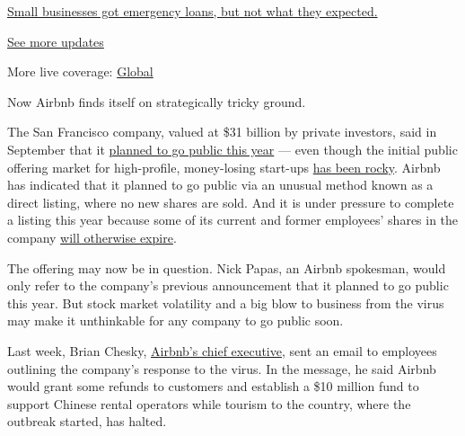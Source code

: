 \href{https://www.nytimes3xbfgragh.onion/live/2020/08/03/business/stock-market-today-coronavirus?action=click\&pgtype=Article\&state=default\&region=MAIN_CONTENT_1\&context=storylines_live_updates\#small-businesses-got-emergency-loans-but-not-what-they-expected}{Small
businesses got emergency loans, but not what they expected.}

\href{https://www.nytimes3xbfgragh.onion/live/2020/08/03/business/stock-market-today-coronavirus?action=click\&pgtype=Article\&state=default\&region=MAIN_CONTENT_1\&context=storylines_live_updates}{See
more updates}

More live coverage:
\href{https://www.nytimes3xbfgragh.onion/2020/08/03/world/coronavirus-covid-19.html?action=click\&pgtype=Article\&state=default\&region=MAIN_CONTENT_1\&context=storylines_live_updates}{Global}

Now Airbnb finds itself on strategically tricky ground.

The San Francisco company, valued at \$31 billion by private investors,
said in September that it
\href{https://www.nytimes3xbfgragh.onion/2019/09/19/technology/airbnb-ipo-2020.html}{planned
to go public this year} --- even though the initial public offering
market for high-profile, money-losing start-ups
\href{https://www.nytimes3xbfgragh.onion/2019/09/26/business/tech-ipo-market.html}{has
been rocky}. Airbnb has indicated that it planned to go public via an
unusual method known as a direct listing, where no new shares are sold.
And it is under pressure to complete a listing this year because some of
its current and former employees' shares in the company
\href{https://www.nytimes3xbfgragh.onion/2019/09/20/technology/airbnb-employees-ipo-payouts.html}{will
otherwise expire}.

The offering may now be in question. Nick Papas, an Airbnb spokesman,
would only refer to the company's previous announcement that it planned
to go public this year. But stock market volatility and a big blow to
business from the virus may make it unthinkable for any company to go
public soon.

Last week, Brian Chesky,
\href{https://www.nytimes3xbfgragh.onion/2014/10/12/business/brian-chesky-of-airbnb-on-scratching-the-itch-to-create.html}{Airbnb's
chief executive}, sent an email to employees outlining the company's
response to the virus. In the message, he said Airbnb would grant some
refunds to customers and establish a \$10 million fund to support
Chinese rental operators while tourism to the country, where the
outbreak started, has halted.

